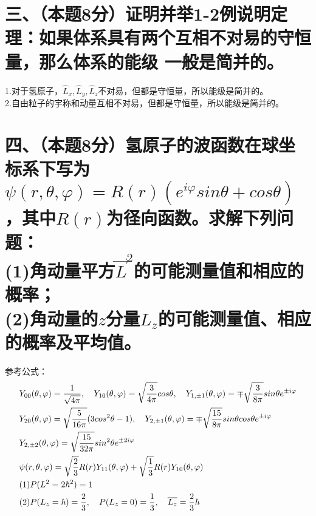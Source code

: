 \documentclass[UTF8]{ctexart}
\begin{document}
\section*{三、（本题8分）证明并举1-2例说明定理：如果体系具有两个互相不对易的守恒量，那么体系的能级
  一般是简并的。}
1.对于氢原子，$\hat L_x,\hat L_y,\hat L_z$不对易，但都是守恒量，所以能级是简并的。\\
2.自由粒子的宇称和动量互相不对易，但都是守恒量，所以能级是简并的。
\section*{四、（本题8分）氢原子的波函数在球坐标系下写为$\psi(r,\theta,\varphi)=R(r)(e^{i\varphi}
    sin\theta+cos\theta)$，其中$R(r)$为径向函数。求解下列问题：\\
  (1)角动量平方$\vec L^2$的可能测量值和相应的概率；\\
  (2)角动量的$z$分量$L_z$的可能测量值、相应的概率及平均值。}
参考公式：
\begin{equation*}
  \begin{aligned}
     & Y_{00}(\theta,\varphi)=\frac{1}{\sqrt{4\pi}},\quad
    Y_{10}(\theta,\varphi)=\sqrt\frac{3}{4\pi}cos\theta,\quad
    Y_{1,\pm1}(\theta,\varphi)=\mp\sqrt\frac{3}{8\pi}sin\theta e^{\pm i\varphi}                    \\
     & Y_{20}(\theta,\varphi)=\sqrt\frac{5}{16\pi}(3cos^2\theta-1),\quad
    Y_{2,\pm1}(\theta,\varphi)=\mp\sqrt\frac{15}{8\pi}sin\theta cos\theta e^{\pm i\varphi}         \\
     & Y_{2,\pm2}(\theta,\varphi)=\sqrt\frac{15}{32\pi}sin^2\theta e^{\pm2i\varphi}                \\
    \newline
    \newline
     & \psi(r,\theta,\varphi)=\sqrt\frac{2}{3}R(r)Y_{11}(\theta,\varphi)
    +\sqrt\frac{1}{3}R(r)Y_{10}(\theta,\varphi)                                                    \\
     & (1)P(L^2=2\hbar^2)=1                                                                        \\
     & (2)P(L_z=\hbar)=\frac{2}{3},\quad P(L_z=0)=\frac{1}{3},\quad\overline{L_z}=\frac{2}{3}\hbar
  \end{aligned}
\end{equation*}
\end{document}
